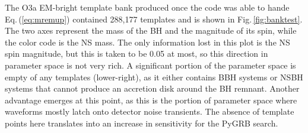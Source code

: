 \documentclass[binding=0.6cm, LaM]{sapthesis}
\begin{document}

	The O3a EM-bright template bank produced once the code was able to hande Eq.\,(\ref{eq:mremup}) contained 288,177 templates and is shown in Fig.\,\ref{fig:banktest}.  The two axes represent the mass of the BH and the magnitude of its spin, while the color code is the NS mass.  The only information lost in this plot is the NS spin magnitude, but this is taken to be 0.05 at most, so this direction in parameter space is not very rich.
        A significant portion of the parameter space is empty of any templates  (lower-right),
        as it either contains BBH systems or NSBH systems that cannot produce an accretion disk around the BH remnant.
        Another advantage emerges at this point, as this is the portion of parameter space where waveforms mostly latch onto detector noise transients.  The absence of template points here translates into an increase in sensitivity for the {\rm PyGRB} search.
\end{document}
